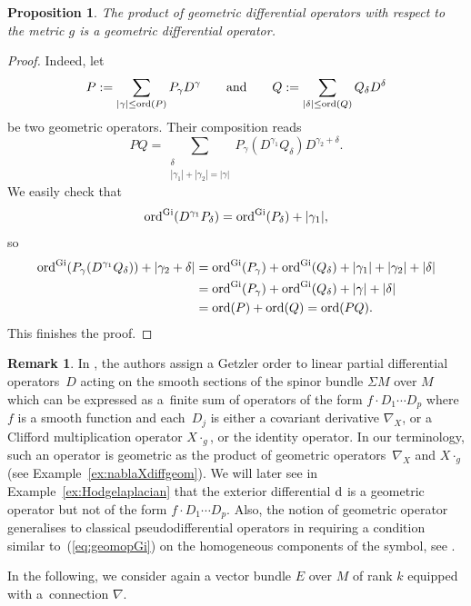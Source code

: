 \documentclass[10pt,a4paper]{amsart}
\numberwithin{equation}{section}
\newtheorem{prop}[thm]{Proposition}
\theoremstyle{definition}
\newtheorem{rk}[thm]{Remark}
\begin{document}
\begin{prop}\label{prop:productgeom}
The product of geometric differential operators with respect to
the metric $g$ is a geometric differential operator.
\end{prop}
\begin{proof}
Indeed, let
\[P:= \sum_{\vert\gamma\vert \leq {\rm ord} (P)} {P_{\gamma}D^{\gamma}}\qquad\text{and}\qquad Q:= \sum_{\vert\delta\vert \leq {\rm ord} (Q)} {Q_{\delta}D^{\delta}}\]
be two geometric operators. Their composition reads			
\[PQ= \sum_{\substack{\delta\\ |\gamma_1|+|\gamma_2|=|\gamma| } } P_{\gamma} (D^{\gamma_1} Q_{\delta}) D^{\gamma_2+\delta}.\]
We easily check that
\[{\rm ord}^{\rm Gi} (D^{\gamma_1} P_{\delta} )= {\rm ord}^{\rm Gi} (P_{\delta} )+\vert {\gamma_1}\vert,\]
so
\begin{align*}
{\rm ord}^{\rm Gi} (P_\gamma (D^{\gamma_1} Q_{\delta}) )+|\gamma_2+\delta|&{}= {\rm ord}^{\rm Gi}(P_\gamma)+{\rm ord}^{\rm Gi} (Q_{\delta} )+\vert {\gamma_1}\vert+\vert {\gamma_2}\vert+\vert {\delta}\vert\\
&{}= {\rm ord}^{\rm Gi}(P_\gamma)+{\rm ord}^{\rm Gi} (Q_{\delta} )+\vert {\gamma}\vert+\vert {\delta}\vert\\
&{}= {\rm ord} (P)+{\rm ord} (Q) = {\rm ord} (PQ).
\end{align*}
This finishes the proof.
\end{proof}
\begin{rk} In \cite{HY}, the authors assign a Getzler order to linear partial differential operators~$D$ acting on the smooth sections of the spinor bundle $\Sigma M$ over $M$ which can be expressed as a~finite sum of operators of the form $f\cdot D_1\cdots D_p$ where $f$ is a smooth function and each~$D_j$ is either a covariant derivative $\nabla_X$, or a Clifford multiplication operator $X\cdot_g$, or the identity operator. In our terminology, such an operator is geometric as the product of geometric operators~$\nabla_X$ and $X\cdot_g$ (see Example~\ref{ex:nablaXdiffgeom}). We will later see in Example~\ref{ex:Hodgelaplacian} that the exterior differential ${\rm d}$ is a geometric operator but not of the form $f\cdot D_1\cdots D_p$. Also, the notion of geometric operator generalises to classical pseudodifferential operators in requiring a condition similar to~(\ref{eq:geomopGi}) on the homogeneous components of the symbol, see \cite{MP}.
\end{rk}

In the following, we consider again a vector bundle $E$ over $M$ of rank $k$ equipped with a~connection $\nabla$.
\end{document}
